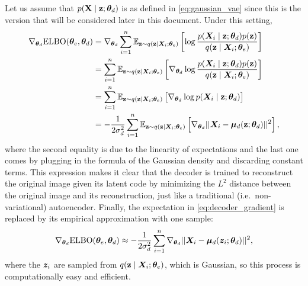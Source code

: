 Let us assume that $p({\mathbf{X}} \mid {\mathbf{z}}; {\bm{\theta}}_d)$ is as defined in \eqref{eq:gaussian_vae} since this is the version that will be considered later in this document. Under this setting,
\begin{align}
    \nabla_{{\bm{\theta}}_d} \mathrm{ELBO}({\bm{\theta}}_e, {\bm{\theta}}_d) &= \nabla_{{\bm{\theta}}_d} \sum_{i=1}^n \mathbb{E}_{{\mathbf{z}} \sim q({\mathbf{z}} \mid {\bm{X}}_i; {\bm{\theta}}_e)} \left[\log \frac{p({\bm{X}}_i \mid {\mathbf{z}}; {\bm{\theta}}_d)p({\mathbf{z}})}{q({\mathbf{z}} \mid {\bm{X}}_i; {\bm{\theta}}_e)} \right] \nonumber\\
    &= \sum_{i=1}^n \mathbb{E}_{{\mathbf{z}} \sim q({\mathbf{z}} \mid {\bm{X}}_i; {\bm{\theta}}_e)} \left[\nabla_{{\bm{\theta}}_d} \log \frac{p({\bm{X}}_i \mid {\mathbf{z}}; {\bm{\theta}}_d)p({\mathbf{z}})}{q({\mathbf{z}} \mid {\bm{X}}_i; {\bm{\theta}}_e)} \right] \nonumber\\
    &= \sum_{i=1}^n \mathbb{E}_{{\mathbf{z}} \sim q({\mathbf{z}} \mid {\bm{X}}_i; {\bm{\theta}}_e)} \left[ \nabla_{{\bm{\theta}}_d} \log p({\bm{X}}_i \mid {\mathbf{z}}; {\bm{\theta}}_d) \right] \nonumber\\
    &= -\frac{1}{2\sigma_d^2}\sum_{i=1}^n \mathbb{E}_{{\mathbf{z}} \sim q({\mathbf{z}} \mid {\bm{X}}_i; {\bm{\theta}}_e)} \left[ \nabla_{{\bm{\theta}}_d} ||{\bm{X}}_i - {\bm{\mu}}_d({\mathbf{z}}; {\bm{\theta}}_d)||^2  \right], \label{eq:decoder_gradient}
\end{align}
where the second equality is due to the linearity of expectations and the last one comes by plugging in the formula of the Gaussian density and discarding constant terms. This expression makes it clear that the decoder is trained to reconstruct the original image given its latent code by minimizing the $L^2$ distance between the original image and its reconstruction, just like a traditional (i.e.\ non-variational) autoencoder. Finally, the expectation in \eqref{eq:decoder_gradient} is replaced by its empirical approximation with one sample:
\begin{align}
    \label{eq:vae_decoder_grad}
    \nabla_{{\bm{\theta}}_d} \mathrm{ELBO}({\bm{\theta}}_e, {\bm{\theta}}_d) \approx -\frac{1}{2\sigma_d^2} \sum_{i=1}^n \nabla_{{\bm{\theta}}_d} ||{\bm{X}}_i - {\bm{\mu}}_d({\bm{z}}_i; {\bm{\theta}}_d)||^2,
\end{align}
where the ${\bm{z}}_i$ are sampled from $q({\mathbf{z}} \mid {\bm{X}}_i; {\bm{\theta}}_e)$, which is Gaussian, so this process is computationally easy and efficient.

